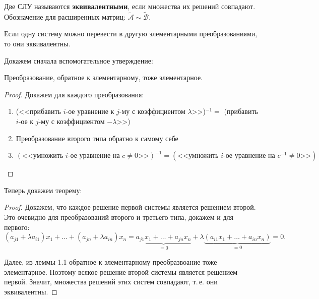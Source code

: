 \begin{definition}
    Две СЛУ называются \textbf{эквивалентными}, если множества их решений совпадают. Обозначение для расширенных матриц: $\widetilde{\mathcal{A}} \sim \widetilde{\mathcal{B}}$.
\end{definition}

\begin{theorem}
    Если одну систему можно перевести в другую элементарными преобразованиями, то они \mbox{эквивалентны}.
\end{theorem}

Докажем сначала вспомогательное утверждение:

\begin{lemma}
    Преобразование, обратное к элементарному, тоже элементарное.
\end{lemma}

\begin{proof}
    Докажем для каждого преобразования:
    \begin{enumerate}
        \item (<<прибавить $i$-ое уравнение к $j$-му с коэффициентом $\lambda$>>)$^{-1} = {}$ (прибавить $i$-ое к $j$-му с коэффициентом $-\lambda$>>)
        \item Преобразование второго типа обратно к самому себе
        \item $(\text{<<умножить $i$-ое уравнение на $c \ne 0$>>})^{-1} = (\text{<<умножить $i$-ое уравнение на $c^{-1} \ne 0$>>})$
    \end{enumerate}
\end{proof}

Теперь докажем теорему:

\begin{proof}
    Докажем, что каждое решение первой системы является решением второй. Это очевидно для преобразований второго и третьего типа, докажем и для первого:
    $$
    (a_{j1} + \lambda a_{i1})x_1 + \ldots + (a_{jn} + \lambda a_{in})x_n = \underbrace{a_{j1}x_1 + \ldots + a_{jn}x_n}_{{} = 0} + \lambda\underbrace{(a_{i1}x_1 + \ldots + a_{in}x_n)}_{{} = 0} = 0.
    $$

    Далее, из леммы 1.1 обратное к элементарному преобразвоание тоже элементарное. Поэтому всякое решение второй системы является решением первой. Значит, множества решений этих систем совпадают, т.\,е. они эквивалентны.
\end{proof}

